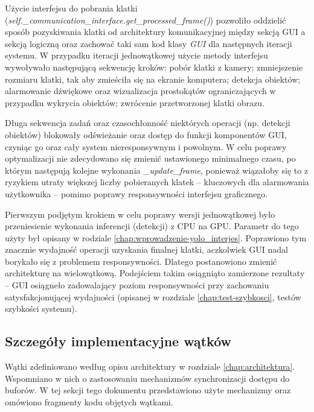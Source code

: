 Użycie interfejsu do pobrania klatki (\emph{self.\_communication\_interface.get\_processed\_frame()}) pozwoliło oddzielić sposób pozyskiwania klatki od architektury komunikacyjnej między sekcją GUI a sekcją logiczną oraz zachować taki sam kod klasy \emph{GUI} dla następnych iteracji systemu. W przypadku iteracji jednowątkowej użycie metody interfejsu wywoływało następującą sekwencję kroków: pobór klatki z kamery; zmniejszenie rozmiaru klatki, tak aby zmieściła się na ekranie komputera; detekcja obiektów; alarmowanie dźwiękowe oraz wizualizacja prostokątów ograniczających w przypadku wykrycia obiektów; zwrócenie przetworzonej klatki obrazu.

Długa sekwencja zadań oraz czasochłonność niektórych operacji (np. detekcji obiektów) blokowały odświeżanie oraz dostęp do funkcji komponentów GUI, czyniąc go oraz cały system nieresponsywnym i powolnym. W celu poprawy optymalizacji nie zdecydowano się zmienić ustawionego minimalnego czasu, po którym następują kolejne wykonania \emph{\_update\_frame}, ponieważ wiązałoby się to z ryzykiem utraty większej liczby pobieranych klatek -- kluczowych dla alarmowania użytkownika -- pomimo poprawy responsywności interfejsu graficznego.

Pierwszym podjętym krokiem w celu poprawy wersji jednowątkowej było przeniesienie wykonania inferencji (detekcji) z CPU na GPU. Parametr do tego użyty był opisany w rodziale \ref{chap:wprowadzenie-yolo_interjes}. Poprawiono tym znacznie wydajność operacji uzyskania finalnej klatki, aczkolwiek GUI nadal borykało się z problemem responsywności. Dlatego postanowiono zmienić architekturę na wielowątkową. Podejściem takim osiągniąto zamierzone rezultaty -- GUI osiągneło zadowalający poziom responsywności przy zachowaniu satysfakcjonującej wydajności (opisanej w rozdziale \ref{chap:test-szybkosci}, testów szybkości systemu).







\subsection{Szczegóły implementacyjne wątków}
Wątki zdefiniowano według opisu architektury w rozdziale \ref{chap:architektura}. Wspomniano w nich o zastosowaniu mechanizmów synchronizacji dostępu do buforów. W tej sekcji tego dokumentu przedstawiono użyte mechanizmy oraz omówiono fragmenty kodu objętych wątkami.

